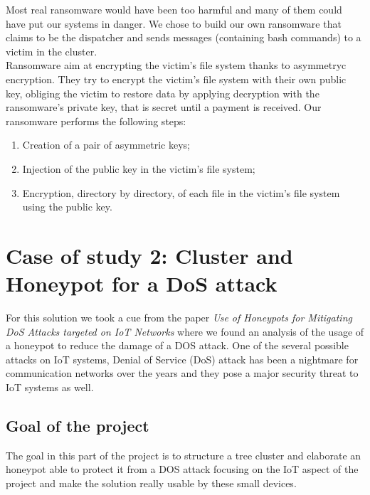 \noindent Most real ransomware would have been too harmful and many of them could have put our systems in danger. We chose to build our own ransomware that claims to be the dispatcher and sends messages (containing bash commands) to a victim in the cluster. \\
Ransomware aim at encrypting the victim's file system thanks to asymmetryc encryption. They try to encrypt the victim's file system with their own public key, obliging the victim to restore data by applying decryption with the ransomware's private key, that is secret until a payment is received.
Our ransomware performs the following steps:
\begin{enumerate}
  \item Creation of a pair of asymmetric keys;
  \item Injection of the public key in the victim's file system;
  \item Encryption, directory by directory, of each file in the victim's file system using the public key.
\end{enumerate}




\section{Case of study 2: Cluster and Honeypot for a DoS attack}

For this solution we took a cue from the paper \textit{Use of Honeypots for Mitigating DoS Attacks 
targeted on IoT Networks}\cite{7944057} where we found an analysis of the usage of a honeypot to reduce the damage of a DOS attack. One of the several possible attacks on IoT 
systems, Denial of Service (DoS) attack has been a nightmare for 
communication networks over the years and they 
pose a major security threat to IoT systems as well.\\
\subsection{Goal of the project}

The goal in this part of the project is to structure a tree cluster and elaborate an honeypot able to protect it from a DOS attack 
focusing on the IoT aspect of the project and make the solution really usable by these small devices.
  
